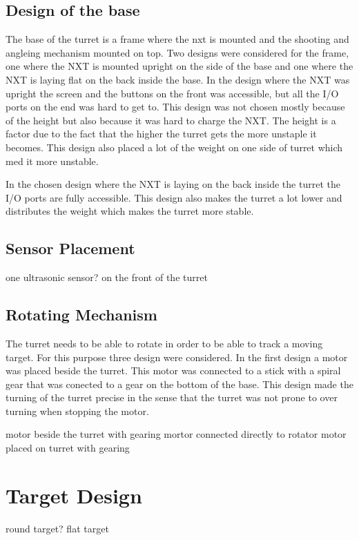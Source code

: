 \subsection{Design of the base}
The base of the turret is a frame where the nxt is mounted and the shooting and
angleing mechanism mounted on top. Two designs were considered for the frame,
one where the NXT is mounted upright on the side of the base and one where the
NXT is laying flat on the back inside the base. In the design where the NXT was
upright the screen and the buttons on the front was accessible, but all the I/O
ports on the end was hard to get to. This design was not chosen mostly because
of the height but also because it was hard to charge the NXT. The height is a
factor due to the fact that the higher the turret gets the more unstaple it
becomes. This design also placed a lot of the weight on one side of turret
which med it more unstable.\nl

In the chosen design where the NXT is laying on the back inside the turret the
I/O ports are fully accessible. This design also makes the turret a lot lower and
distributes the weight which makes the turret more stable. 
\subsection{Sensor Placement}
one ultrasonic sensor?
on the front of the turret
\subsection{Rotating Mechanism}
The turret needs to be able to rotate in order to be able to track a moving
target. For this purpose three design were considered. In the first design a
motor was placed beside the turret. This motor was connected to a stick with a
spiral gear that was conected to a gear on the bottom of the base. This design
made the turning of the turret precise in the sense that the turret was not
prone to over turning when stopping the motor. 


motor beside the turret with gearing
mortor connected directly to rotator
motor placed on turret with gearing

\section{Target Design}
round target?
flat target

